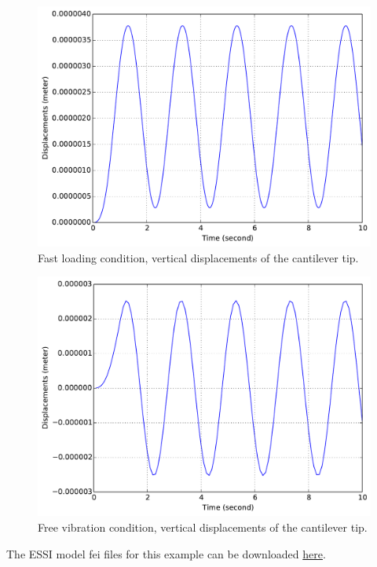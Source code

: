 \documentclass[fleqn,11pt]{article}
\begin{document}
\begin{figure}[!htb]
  \centering
  \includegraphics[width=12cm]{../Figure-files/_Chapter_Appendix_Illustrative_Examples/brick-mass-1element-fastLoading.pdf}
  \caption{Fast loading condition, vertical displacements of the cantilever tip.}
  \label{fig_27brick-mass-fast}
\end{figure}

\begin{figure}[!htb]
  \centering
  \includegraphics[width=12cm]{../Figure-files/_Chapter_Appendix_Illustrative_Examples/brick-mass-1element-freeVibration.pdf}
  \caption{Free vibration condition, vertical displacements of the cantilever tip.}
  \label{fig_27brick-mass-freeVib}
\end{figure}


The    ESSI   model   fei   files   for   this   example   can   be   downloaded
\href{https://github.com/BorisJeremic/Real-ESSI-Examples/blob/master/model_fei_file/27NodeBrick_1element_dynamic/27NodeBrick_1element_dynamic.tgz?raw=true}{here}.
\end{document}
